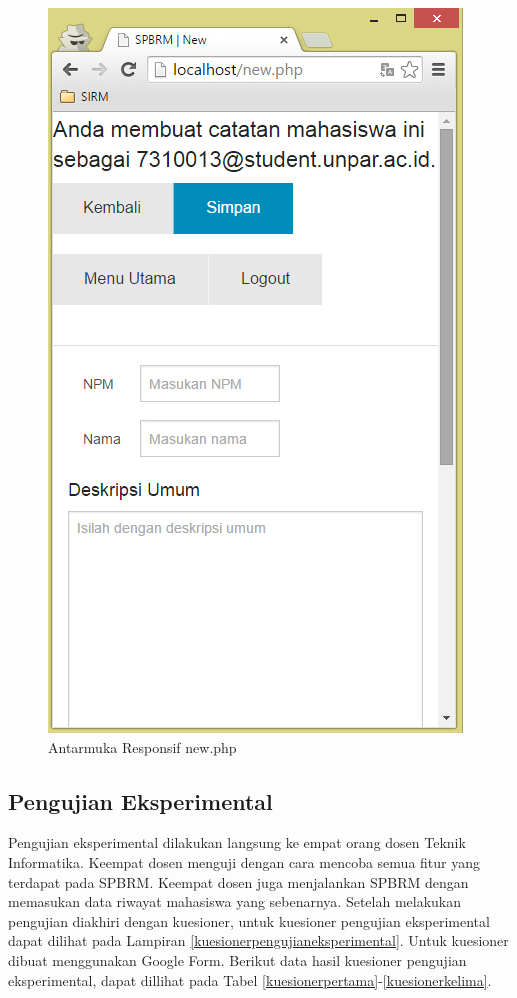\begin{figure}[H]
\centering
\includegraphics[scale=0.44]{Gambar/pengujian24.png}
\caption[Antarmuka Responsif new.php]{Antarmuka Responsif new.php} 
\label{fig:responsifnew}
\end{figure}

\subsection{Pengujian Eksperimental}
\label{sec:pengujianeksperimantal}

Pengujian eksperimental dilakukan langsung ke empat orang dosen Teknik Informatika. Keempat dosen menguji dengan cara mencoba semua fitur yang terdapat pada SPBRM. Keempat dosen juga menjalankan SPBRM dengan memasukan data riwayat mahasiswa yang sebenarnya. Setelah melakukan pengujian diakhiri dengan kuesioner, untuk kuesioner pengujian eksperimental dapat dilihat pada Lampiran \ref{kuesionerpengujianeksperimental}. Untuk kuesioner dibuat menggunakan Google Form. Berikut data hasil kuesioner pengujian eksperimental, dapat dillihat pada Tabel \ref{kuesionerpertama}-\ref{kuesionerkelima}.

